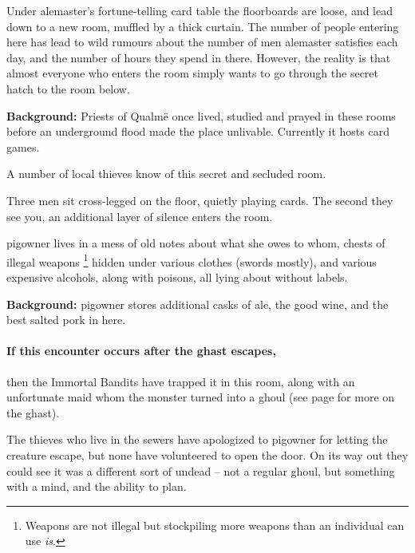 Under \gls{alemaster}'s fortune-telling card table the floorboards are loose, and lead down to a new room, muffled by a thick curtain.
The number of people entering here has lead to wild rumours about the number of men \gls{alemaster} satisfies each day, and the number of hours they spend in there.
However, the reality is that almost everyone who enters the room simply wants to go through the secret hatch to the room below.

\alemaster


\textbf{Background:}
Priests of Qualm\"{e} once lived, studied and prayed in these rooms before an underground flood made the place unlivable.
Currently it hosts card games.

A number of local thieves know of this secret and secluded room.

\begin{boxtext}
  Three men sit cross-legged on the floor, quietly playing cards.
  The second they see you, an additional layer of silence enters the room.
\end{boxtext}



\Gls{pigowner} lives in a mess of old notes about what she owes to whom, chests of illegal weapons%
\footnote{Weapons are not illegal but stockpiling more weapons than an individual can use \emph{is}.}
hidden under various clothes (swords mostly), and various expensive alcohols, along with poisons, all lying about without labels.


\textbf{Background:}
\Gls{pigowner} stores additional casks of ale, the good wine, and the best salted pork in here.

\paragraph{If this encounter occurs after the ghast escapes,}
then the Immortal Bandits have trapped it in this room, along with an unfortunate maid whom the monster turned into a ghoul (see page \pageref{ghastEscape} for more on the ghast).

The thieves who live in the sewers have apologized to \gls{pigowner} for letting the creature escape, but none have volunteered to open the door.
On its way out they could see it was a different sort of undead -- not a regular ghoul, but something with a mind, and the ability to plan.

